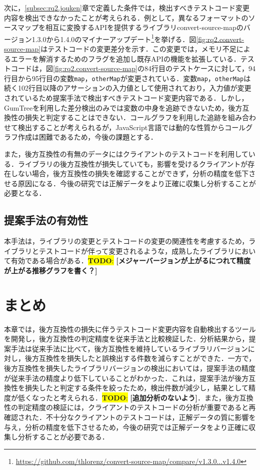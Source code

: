 \documentclass[11pt,dvipdfmx]{jreport}
\newcommand{\todo}[1]{\colorbox{yellow}{{\bf TODO}:}{\color{red} {\textbf{[#1]}}}}
\begin{document}
次に，\ref{subsec:rq2.jouken}章で定義した条件では，検出すべきテストコード変更内容を検出できなかったことが考えられる．例として，異なるフォーマットのソースマップを相互に変換するAPIを提供するライブラリconvert-source-mapのバージョン1.3.0から1.4.0のマイナーアップデート\footnote{\url{https://github.com/thlorenz/convert-source-map/compare/v1.3.0...v1.4.0}}を挙げる．図\ref{fig:rq2.convert-source-map}はテストコードの変更差分を示す．この変更では，メモリ不足によるエラーを解消するためのフラグを追加し既存APIの機能を拡張している．テストコードは，図\ref{fig:rq2.convert-source-map}の84行目のテストケースに対して，94行目から95行目の変数{\verb|map|}，{\verb|otherMap|}が変更されている．変数{\verb|map|}，{\verb|otherMap|}は続く102行目以降のアサーションの入力値として使用されており，入力値が変更されているため提案手法で検出すべきテストコード変更内容である．しかし，GumTreeを利用した差分検出のみでは変数の中身を追跡できないため，後方互換性の損失と判定することはできない．コールグラフを利用した追跡を組み合わせて検出することが考えられるが，JavaScript言語では動的な性質からコールグラフ作成は困難であるため\cite{js-call-graph}，今後の課題とする．

また，後方互換性の有無のデータにはクライアントのテストコードを利用している．ライブラリの後方互換性が損失していても，影響を受けるクライアントが存在しない場合，後方互換性の損失を確認することができず，分析の精度を低下させる原因になる．今後の研究では正解データをより正確に収集し分析することが必要となる．

\subsection{提案手法の有効性}

本手法は，ライブラリの変更とテストコードの変更の関連性を考慮するため，ライブラリとテストコードが伴って変更されるような，成熟したライブラリにおいて有効である場合がある．\todo{メジャーバージョンが上がるにつれて精度が上がる推移グラフを書く？}

\section{まとめ}
本章では，後方互換性の損失に伴うテストコード変更内容を自動検出するツールを開発し，後方互換性の判定精度を従来手法と比較検証した．分析結果から，提案手法は従来手法に比べて，後方互換性を維持しているライブラリバージョンに対し，後方互換性を損失したと誤検出する件数を減らすことができた．一方で，後方互換性を損失したライブラリバージョンの検出においては，提案手法の精度が従来手法の精度より低下していることがわかった．これは，提案手法が後方互換性を損失したと判定する条件を絞ったため，検出件数が減少し，結果として精度が低くなったと考えられる．\todo{追加分析のないよう}．また，後方互換性の判定精度の検証には，クライアントのテストコードの分析が重要であると再確認された．不十分なクライアントのテストコードは，正解データの質に影響を与え，分析の精度を低下させるため，今後の研究では正解データをより正確に収集し分析することが必要である．
\end{document}

